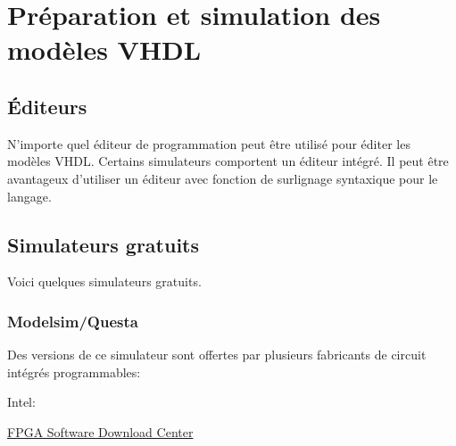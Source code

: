 \documentclass[11pt]{article}
\begin{document}
\section{Préparation et simulation des modèles VHDL}
\label{sec:orgf2cbef9}

\subsection{Éditeurs}
\label{sec:orga42d271}

N'importe quel éditeur de programmation peut être utilisé pour éditer
les modèles VHDL. Certains simulateurs comportent un éditeur
intégré. Il peut être avantageux d'utiliser un éditeur avec fonction
de surlignage syntaxique pour le langage.

\subsection{Simulateurs gratuits}
\label{sec:org20850ed}

Voici quelques simulateurs gratuits. 

\subsubsection{Modelsim/Questa}
\label{sec:org8f4c2a4}

Des versions de ce simulateur sont offertes par plusieurs
fabricants de circuit intégrés programmables:

Intel: 

\href{https://www.intel.com/content/www/us/en/collections/products/fpga/software/downloads.html?s=Newest\&f=\%255B\%257B\%2522name\%2522\%3A\%2522quartusedition\%2522\%2C\%2522facetId\%2522\%3A\%2522quartusedition\%2522\%2C\%2522currentValues\%2522\%3A\%255B\%255D\%257D\%2C\%257B\%2522name\%2522\%3A\%2522quartusaddon\%2522\%2C\%2522facetId\%2522\%3A\%2522quartusaddon\%2522\%2C\%2522currentValues\%2522\%3A\%255B\%257B\%2522value\%2522\%3A\%2522Intel\%25C2\%25AE\%2520FPGA\%2520Simulation\%2520Tools\%2522\%2C\%2522state\%2522\%3A\%2522idle\%2522\%2C\%2522children\%2522\%3A\%255B\%257B\%2522value\%2522\%3A\%2522Questa*-Intel\%25C2\%25AE\%2520FPGA\%2520Starter\%2520Edition\%2522\%2C\%2522state\%2522\%3A\%2522selected\%2522\%257D\%255D\%257D\%255D\%257D\%2C\%257B\%2522name\%2522\%3A\%2522fpgadevicefamily\%2522\%2C\%2522facetId\%2522\%3A\%2522fpgadevicefamily\%2522\%2C\%2522currentValues\%2522\%3A\%255B\%255D\%257D\%2C\%257B\%2522name\%2522\%3A\%2522fpgaplatform\%2522\%2C\%2522facetId\%2522\%3A\%2522fpgaplatform\%2522\%2C\%2522currentValues\%2522\%3A\%255B\%255D\%257D\%2C\%257B\%2522facetId\%2522\%3A\%2522os-rdc\%2522\%2C\%2522name\%2522\%3A\%2522OperatingSystem\%2522\%2C\%2522currentValues\%2522\%3A\%255B\%255D\%257D\%2C\%257B\%2522facetId\%2522\%3A\%2522\%40emtcontenttype\_en\%2522\%2C\%2522name\%2522\%3A\%2522ContentType\%2522\%2C\%2522currentValues\%2522\%3A\%255B\%255D\%257D\%2C\%257B\%2522facetId\%2522\%3A\%2522lastupdated-rdc\%2522\%2C\%2522name\%2522\%3A\%2522lastupdated\%2522\%2C\%2522currentValues\%2522\%3A\%255B\%255D\%257D\%255D\&q=lite}{FPGA Software Download Center}
\end{document}
